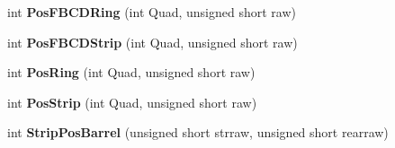 \begin{DoxyCompactItemize}
\item 
\hypertarget{class_calibration_a65ab7c201643a2bc8cb366b9ac20ab3b}{int {\bfseries Pos\-F\-B\-C\-D\-Ring} (int Quad, unsigned short raw)}\label{class_calibration_a65ab7c201643a2bc8cb366b9ac20ab3b}

\item 
\hypertarget{class_calibration_a9ee9ef612f7485f5371916bf524bb036}{int {\bfseries Pos\-F\-B\-C\-D\-Strip} (int Quad, unsigned short raw)}\label{class_calibration_a9ee9ef612f7485f5371916bf524bb036}

\item 
\hypertarget{class_calibration_a240b3ac33e55af3f762d2cecc5d06b2b}{int {\bfseries Pos\-Ring} (int Quad, unsigned short raw)}\label{class_calibration_a240b3ac33e55af3f762d2cecc5d06b2b}

\item 
\hypertarget{class_calibration_a1d12aea9e2be55852b937e8be3ffbae1}{int {\bfseries Pos\-Strip} (int Quad, unsigned short raw)}\label{class_calibration_a1d12aea9e2be55852b937e8be3ffbae1}

\item 
\hypertarget{class_calibration_af2ce93c038cdfd3e9fb1e4ffa093097c}{int {\bfseries Strip\-Pos\-Barrel} (unsigned short strraw, unsigned short rearraw)}\label{class_calibration_af2ce93c038cdfd3e9fb1e4ffa093097c}

\end{DoxyCompactItemize}
